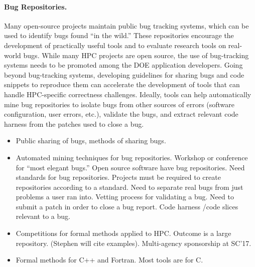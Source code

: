 
\paragraph{Bug Repositories.}

Many open-source projects maintain public bug tracking systems, which can be used to identify bugs found ``in the wild.'' These  repositories encourage the development of practically useful tools and to evaluate research tools on real-world bugs. While many HPC projects are open source, the use of bug-tracking systems needs to be promoted among the DOE application developers. Going beyond bug-tracking systems, developing guidelines for sharing bugs and code snippets to reproduce them can accelerate the development of tools that can handle HPC-specific correctness challenges. Ideally, tools can help automatically mine bug repositories to isolate bugs from other sources of errors (software configuration, user errors, etc.), validate the bugs, and extract relevant code harness from the patches used to close a bug.
%

\begin{itemize}
\item  
 Public sharing of bugs, methods of sharing bugs. 
 
 \item Automated mining techniques for bug repositories.  Workshop or conference for “most elegant bugs.”  Open source software have bug repositories.  Need standards for bug repositories. Projects must be required to create repositories according to a standard. Need to separate real bugs from just problems a user ran into. Vetting process for validating a bug. Need to submit a patch in order to close a bug report.  Code harness /code slices relevant to a bug. 

\item  Competitions for formal methods applied to HPC. Outcome is a large repository. (Stephen will cite examples). Multi-agency sponsorship at SC’17.

\item  Formal methods for C++ and Fortran. Most tools are for C. 

\end{itemize}
 

